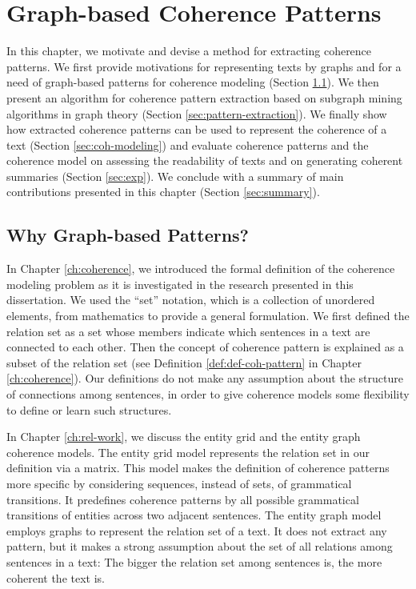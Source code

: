 
\chapter{Graph-based Coherence Patterns}
\label{ch:coh-patterns}

In this chapter, we motivate and devise a method for extracting coherence patterns.  
We first provide motivations for representing texts by graphs and for a need of graph-based patterns for coherence modeling (Section \ref{sec:motivation}).  
We then present an algorithm for coherence pattern extraction based on subgraph mining algorithms in graph theory (Section \ref{sec:pattern-extraction}).  
We finally show how extracted coherence patterns can be used to represent the coherence of a text (Section \ref{sec:coh-modeling}) and evaluate coherence patterns and the coherence model on assessing the readability of texts and on generating coherent summaries (Section \ref{sec:exp}). 
We conclude with a summary of main contributions presented in this chapter (Section \ref{sec:summary}). 

\section{Why Graph-based Patterns?}
\label{sec:motivation}

In Chapter \ref{ch:coherence}, we introduced the formal definition of the coherence modeling problem as it is investigated in the research presented in this dissertation. 
We used the ``set'' notation, which is a collection of unordered elements, from mathematics to provide a general formulation.  
We first defined the relation set as a set whose members indicate which sentences in a text are connected to each other. 
Then the concept of coherence pattern is explained as a subset of the relation set (see Definition \ref{def:def-coh-pattern} in Chapter \ref{ch:coherence}). 
Our definitions do not make any assumption about the structure of connections among sentences, in order to give coherence models some flexibility to define or learn such structures. 

In Chapter \ref{ch:rel-work}, we discuss the entity grid 
\cite{barzilay05a,barzilay08} and the entity graph 
\cite{guinaudeau13} coherence models. 
The entity grid model represents the relation set in our definition via a matrix. 
This model makes the definition of coherence patterns more specific by considering sequences, instead of sets, of grammatical transitions.  
It predefines coherence patterns by all possible grammatical transitions of entities across two adjacent sentences. 
The entity graph model employs graphs to represent the relation set of a text.  
It does not extract any pattern, but it makes a strong assumption about the set of all relations among sentences in a text: The bigger the relation set among sentences is, the more coherent the text is. 

